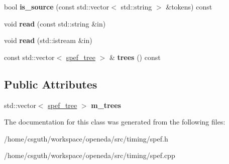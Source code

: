 \begin{DoxyCompactItemize}
\item 
\hypertarget{classophidian_1_1timing_1_1spef_a78073f8ef30052a99b6ba528672d4309}{bool {\bfseries is\-\_\-source} (const std\-::vector$<$ std\-::string $>$ \&tokens) const }\label{classophidian_1_1timing_1_1spef_a78073f8ef30052a99b6ba528672d4309}

\item 
\hypertarget{classophidian_1_1timing_1_1spef_ac5e601c8f9af85458a3179c6fd98585b}{void {\bfseries read} (const std\-::string \&in)}\label{classophidian_1_1timing_1_1spef_ac5e601c8f9af85458a3179c6fd98585b}

\item 
\hypertarget{classophidian_1_1timing_1_1spef_a0bc6a1fa9cee28174a1cdf994b7541d2}{void {\bfseries read} (std\-::istream \&in)}\label{classophidian_1_1timing_1_1spef_a0bc6a1fa9cee28174a1cdf994b7541d2}

\item 
\hypertarget{classophidian_1_1timing_1_1spef_ab5721c8bdecaed49c913c0a3de29ddc0}{const std\-::vector$<$ \hyperlink{structophidian_1_1timing_1_1spef__tree}{spef\-\_\-tree} $>$ \& {\bfseries trees} () const }\label{classophidian_1_1timing_1_1spef_ab5721c8bdecaed49c913c0a3de29ddc0}

\end{DoxyCompactItemize}
\subsection*{Public Attributes}
\begin{DoxyCompactItemize}
\item 
\hypertarget{classophidian_1_1timing_1_1spef_a91fdba4add510f6846581461ba32c145}{std\-::vector$<$ \hyperlink{structophidian_1_1timing_1_1spef__tree}{spef\-\_\-tree} $>$ {\bfseries m\-\_\-trees}}\label{classophidian_1_1timing_1_1spef_a91fdba4add510f6846581461ba32c145}

\end{DoxyCompactItemize}


The documentation for this class was generated from the following files\-:\begin{DoxyCompactItemize}
\item 
/home/csguth/workspace/openeda/src/timing/spef.\-h\item 
/home/csguth/workspace/openeda/src/timing/spef.\-cpp\end{DoxyCompactItemize}
